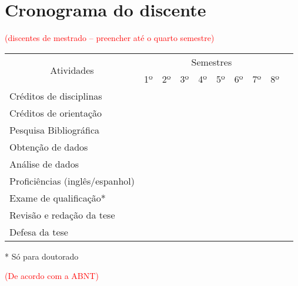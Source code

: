\documentclass[12pt,a4paper,oneside]{book}
\begin{document}
\chapter{Cronograma do discente}
\textcolor{red}{(discentes de mestrado – preencher at\'{e} o quarto semestre)}
\begin{center}
    \begin{tabular}{|l|c|c|c|c|c|c|c|c|c|}
        \hline
        \multicolumn{1}{|c|}{\multirow{2}{*}{Atividades}} & \multicolumn{8}{c|}{Semestres} \\ \cline{2-9}
         & 1$º$ & 2$º$ & 3$º$ & 4$º$ & 5$º$ & 6$º$ & 7$º$ & 8$º$ \\ \hline
        Cr\'{e}ditos de disciplinas & & & & & & & & \\ \hline
        Cr\'{e}ditos de orienta\c{c}\~ao & & & & & & & & \\ \hline
        Pesquisa Bibliogr\'{a}fica & & & & & & & & \\ \hline
        Obten\c{c}\~ao de dados & & & & & & & & \\ \hline
        An\'{a}lise de dados & & & & & & & & \\ \hline
        Profici\^{e}ncias (ingl\^{e}s/espanhol) & & & & & & & & \\ \hline
        Exame de qualifica\c{c}\~ao* & & & & & & & & \\ \hline
        Revis\~{a}o e reda\c{c}\~ao da tese & & & & & & & & \\ \hline
        Defesa da tese & & & & & & & & \\ \hline
    \end{tabular}
\end{center}
* S\'{o} para doutorado
\pagebreak

\medskip
\printbibliography[heading=bibintoc,title={Refer\^{e}ncias},type=article]
\textcolor{red}{(De acordo com a ABNT)}

\backmatter
\end{document}
